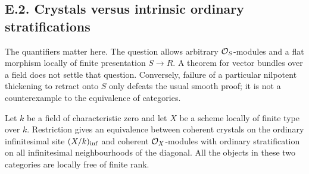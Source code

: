 \subsection{E.2. Crystals versus intrinsic ordinary stratifications}

The quantifiers matter here.  The question allows arbitrary $\mathcal O_S$-modules and a flat morphism locally of finite presentation $S\to R$.  A theorem for vector bundles over a field does not settle that question.  Conversely, failure of a particular nilpotent thickening to retract onto $S$ only defeats the usual smooth proof; it is not a counterexample to the equivalence of categories.

\begin{proposition}\label{prop:DE-E2-coherent}
Let $k$ be a field of characteristic zero and let $X$ be a scheme locally of finite type over $k$.  Restriction gives an equivalence between coherent crystals on the ordinary infinitesimal site $(X/k)_{\rm inf}$ and coherent $\mathcal O_X$-modules with ordinary stratification on all infinitesimal neighbourhoods of the diagonal.  All the objects in these two categories are locally free of finite rank.
\end{proposition}
